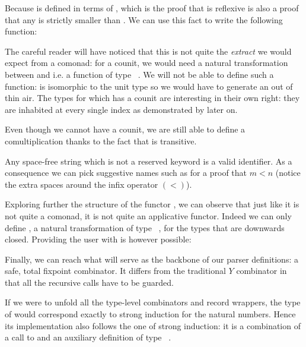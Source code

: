 \medskip{}

Because \AF{\_<\_} is defined in terms of , 
which is the proof that  is reflexive is also a proof
that any  is strictly smaller than  \AF{+} .
We can use this fact to write the following  function:


 The careful reader will have noticed
that this is not quite the \textit{extract} we would expect from a
comonad: for a counit, we would need a natural transformation
between \BOX{}  and  i.e. a function of type
\mbox{\AF{[} \BOX{}    \AF{]}}. We will not be able
to define such a function: \BOX{}   is isomorphic to
the unit type so we would have to generate an   out
of thin air. The types  for which \BOX{} has a counit are
interesting in their own right: they are inhabited at every single
index as demonstrated by  later on.

\medskip{}

Even though we cannot have a counit, we are still able to define
a comultiplication thanks to the fact that \AF{\_<\_} is transitive.


 Any space-free string which
is not a reserved keyword is a valid identifier. As a consequence
we can pick suggestive names such as  for a proof that $m < n$
(notice the extra spaces around the infix operator $(<)$).

\medskip{}

Exploring further the structure of the functor \BOX{}, we can observe
that just like it is not quite a comonad, it is not quite an applicative
functor. Indeed we can only define , a natural transformation
of type \mbox{\AF{[}   \AR{\BOX{}}  \AF{]}}, for the types 
that are downwards closed. Providing the user with  is however
possible:


Finally, we can reach what will serve as the backbone of our parser
definitions: a safe, total fixpoint combinator. It differs from the
traditional $Y$ combinator in that all the recursive calls have to be
guarded.


If we were to unfold all the type-level combinators and record wrappers,
the type of  would correspond exactly to strong induction for
the natural numbers. Hence its implementation also follows the one of strong
induction: it is a combination of a call to  and an auxiliary
definition  of type \mbox{\AF{[} \AR{\BOX{}}  
 \AF{]}  \AF{[} \AR{\BOX}  \AF{]}}.

